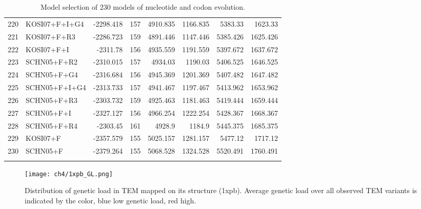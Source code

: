 \documentclass[12pt]{article}
\begin{document}
\begin{longtable}{clrrrrrr}
	220 & KOSI07+F+I+G4 & -2298.418 & 157 & 4910.835 & 1166.835 & 5383.33 & 1623.33 \\ 
	221 & KOSI07+F+R3 & -2286.723 & 159 & 4891.446 & 1147.446 & 5385.426 & 1625.426 \\ 
	222 & KOSI07+F+I & -2311.78 & 156 & 4935.559 & 1191.559 & 5397.672 & 1637.672 \\ 
	223 & SCHN05+F+R2 & -2310.015 & 157 & 4934.03 & 1190.03 & 5406.525 & 1646.525 \\ 
	224 & SCHN05+F+G4 & -2316.684 & 156 & 4945.369 & 1201.369 & 5407.482 & 1647.482 \\ 
	225 & SCHN05+F+I+G4 & -2313.733 & 157 & 4941.467 & 1197.467 & 5413.962 & 1653.962 \\ 
	226 & SCHN05+F+R3 & -2303.732 & 159 & 4925.463 & 1181.463 & 5419.444 & 1659.444 \\ 
	227 & SCHN05+F+I & -2327.127 & 156 & 4966.254 & 1222.254 & 5428.367 & 1668.367 \\ 
	228 & SCHN05+F+R4 & -2303.45 & 161 & 4928.9 & 1184.9 & 5445.375 & 1685.375 \\ 
	229 & KOSI07+F & -2357.579 & 155 & 5025.157 & 1281.157 & 5477.12 & 1717.12 \\ 
	230 & SCHN05+F & -2379.264 & 155 & 5068.528 & 1324.528 & 5520.491 & 1760.491 \\ 
  \caption{Model selection of 230 models of nucleotide and codon evolution.}
  \label{tab:AIC_full}
\end{longtable}



\begin{figure}[H]
     \centering
	\texttt{[image: ch4/1xpb\_GL.png]}
	\caption{Distribution of genetic load in TEM mapped on its structure (1xpb). 
	Average genetic load over all observed TEM variants is indicated by the color, blue low genetic load, red high.}
	\label{fig:tem2016_3d}
\end{figure}
\end{document}
